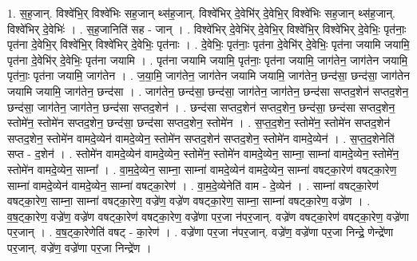 \documentclass[17pt]{extarticle}
\begin{document}
1. स॒ह॒जान्. विश्वे॑भि॒र् विश्वे॑भिः सह॒जान् थ्स॑ह॒जान्. विश्वे॑भिर् दे॒वेभि॑र् दे॒वेभि॒र् विश्वे॑भिः सह॒जान् थ्स॑ह॒जान्. विश्वे॑भिर् दे॒वेभिः॑ । . स॒ह॒जानिति॑ सह - जान् । . विश्वे॑भिर् दे॒वेभि॑र् दे॒वेभि॒र् विश्वे॑भि॒र् विश्वे॑भिर् दे॒वेभिः॒ पृत॑नाः॒ पृत॑ना दे॒वेभि॒र् विश्वे॑भि॒र् विश्वे॑भिर् दे॒वेभिः॒ पृत॑नाः । . दे॒वेभिः॒ पृत॑नाः॒ पृत॑ना दे॒वेभि॑र् दे॒वेभिः॒ पृत॑ना जयामि जयामि॒ पृत॑ना दे॒वेभि॑र् दे॒वेभिः॒ पृत॑ना जयामि । . पृत॑ना जयामि जयामि॒ पृत॑नाः॒ पृत॑ना जयामि॒ जाग॑तेन॒ जाग॑तेन जयामि॒ पृत॑नाः॒ पृत॑ना जयामि॒ जाग॑तेन । . ज॒या॒मि॒ जाग॑तेन॒ जाग॑तेन जयामि जयामि॒ जाग॑तेन॒ छन्द॑सा॒ छन्द॑सा॒ जाग॑तेन जयामि जयामि॒ जाग॑तेन॒ छन्द॑सा । . जाग॑तेन॒ छन्द॑सा॒ छन्द॑सा॒ जाग॑तेन॒ जाग॑तेन॒ छन्द॑सा सप्तद॒शेन॑ सप्तद॒शेन॒ छन्द॑सा॒ जाग॑तेन॒ जाग॑तेन॒ छन्द॑सा सप्तद॒शेन॑ । . छन्द॑सा सप्तद॒शेन॑ सप्तद॒शेन॒ छन्द॑सा॒ छन्द॑सा सप्तद॒शेन॒ स्तोमे॑न॒ स्तोमे॑न सप्तद॒शेन॒ छन्द॑सा॒ छन्द॑सा सप्तद॒शेन॒ स्तोमे॑न । . स॒प्त॒द॒शेन॒ स्तोमे॑न॒ स्तोमे॑न सप्तद॒शेन॑ सप्तद॒शेन॒ स्तोमे॑न वामदे॒व्येन॑ वामदे॒व्येन॒ स्तोमे॑न सप्तद॒शेन॑ सप्तद॒शेन॒ स्तोमे॑न वामदे॒व्येन॑ । . स॒प्त॒द॒शेनेति॑ सप्त - द॒शेन॑ । . स्तोमे॑न वामदे॒व्येन॑ वामदे॒व्येन॒ स्तोमे॑न॒ स्तोमे॑न वामदे॒व्येन॒ साम्ना॒ साम्ना॑ वामदे॒व्येन॒ स्तोमे॑न॒ स्तोमे॑न वामदे॒व्येन॒ साम्ना᳚ । . वा॒म॒दे॒व्येन॒ साम्ना॒ साम्ना॑ वामदे॒व्येन॑ वामदे॒व्येन॒ साम्ना॑ वषट्का॒रेण॑ वषट्का॒रेण॒ साम्ना॑ वामदे॒व्येन॑ वामदे॒व्येन॒ साम्ना॑ वषट्का॒रेण॑ । . वा॒म॒दे॒व्येनेति॑ वाम - दे॒व्येन॑ । . साम्ना॑ वषट्का॒रेण॑ वषट्का॒रेण॒ साम्ना॒ साम्ना॑ वषट्का॒रेण॒ वज्रे॑ण॒ वज्रे॑ण वषट्का॒रेण॒ साम्ना॒ साम्ना॑ वषट्का॒रेण॒ वज्रे॑ण । . व॒ष॒ट्का॒रेण॒ वज्रे॑ण॒ वज्रे॑ण वषट्का॒रेण॑ वषट्का॒रेण॒ वज्रे॑णा पर॒जा न॑पर॒जान्. वज्रे॑ण वषट्का॒रेण॑ वषट्का॒रेण॒ वज्रे॑णा पर॒जान् । . व॒ष॒ट्का॒रेणेति॑ वषट् - का॒रेण॑ । . वज्रे॑णा पर॒जा न॑पर॒जान्. वज्रे॑ण॒ वज्रे॑णा पर॒जा निन्द्रे॒ णेन्द्रे॑णा पर॒जान्. वज्रे॑ण॒ वज्रे॑णा पर॒जा निन्द्रे॑ण । \newline
\end{document}
